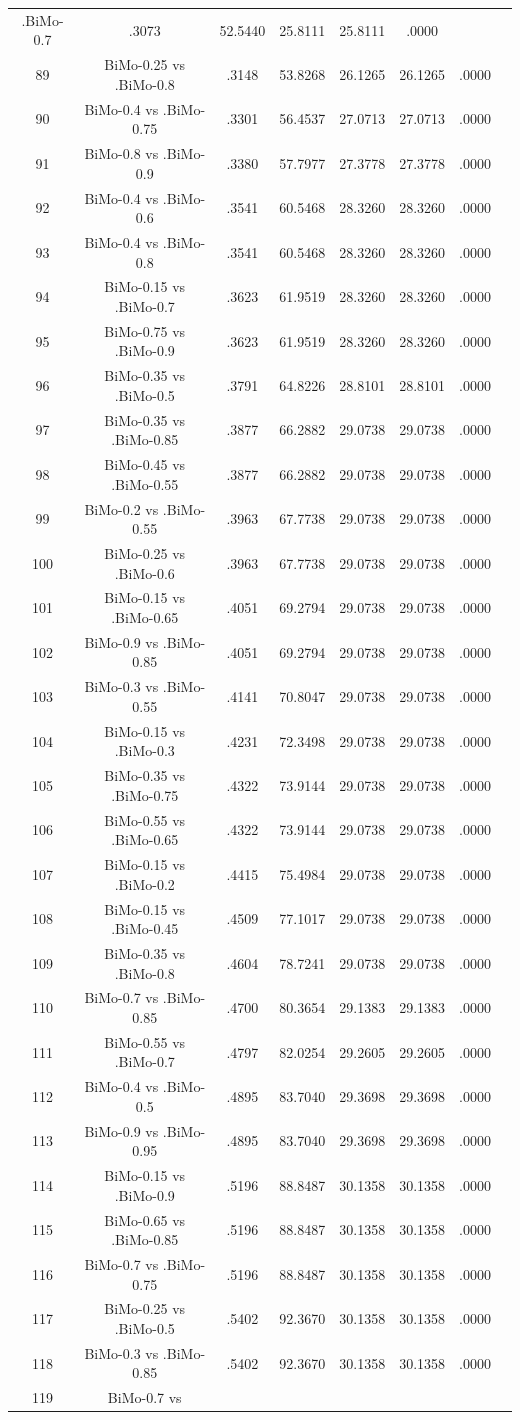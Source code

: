 \documentclass[a4paper,10pt]{article}
\begin{document}
\begin{landscape}
\begin{table}[!htp]
\begin{tabular}{cccccccc}
.BiMo-0.7&.3073&52.5440&25.8111&25.8111&.0000\\89&BiMo-0.25 vs .BiMo-0.8&.3148&53.8268&26.1265&26.1265&.0000\\90&BiMo-0.4 vs .BiMo-0.75&.3301&56.4537&27.0713&27.0713&.0000\\91&BiMo-0.8 vs .BiMo-0.9&.3380&57.7977&27.3778&27.3778&.0000\\92&BiMo-0.4 vs .BiMo-0.6&.3541&60.5468&28.3260&28.3260&.0000\\93&BiMo-0.4 vs .BiMo-0.8&.3541&60.5468&28.3260&28.3260&.0000\\94&BiMo-0.15 vs .BiMo-0.7&.3623&61.9519&28.3260&28.3260&.0000\\95&BiMo-0.75 vs .BiMo-0.9&.3623&61.9519&28.3260&28.3260&.0000\\96&BiMo-0.35 vs .BiMo-0.5&.3791&64.8226&28.8101&28.8101&.0000\\97&BiMo-0.35 vs .BiMo-0.85&.3877&66.2882&29.0738&29.0738&.0000\\98&BiMo-0.45 vs .BiMo-0.55&.3877&66.2882&29.0738&29.0738&.0000\\99&BiMo-0.2 vs .BiMo-0.55&.3963&67.7738&29.0738&29.0738&.0000\\100&BiMo-0.25 vs .BiMo-0.6&.3963&67.7738&29.0738&29.0738&.0000\\101&BiMo-0.15 vs .BiMo-0.65&.4051&69.2794&29.0738&29.0738&.0000\\102&BiMo-0.9 vs .BiMo-0.85&.4051&69.2794&29.0738&29.0738&.0000\\103&BiMo-0.3 vs .BiMo-0.55&.4141&70.8047&29.0738&29.0738&.0000\\104&BiMo-0.15 vs .BiMo-0.3&.4231&72.3498&29.0738&29.0738&.0000\\105&BiMo-0.35 vs .BiMo-0.75&.4322&73.9144&29.0738&29.0738&.0000\\106&BiMo-0.55 vs .BiMo-0.65&.4322&73.9144&29.0738&29.0738&.0000\\107&BiMo-0.15 vs .BiMo-0.2&.4415&75.4984&29.0738&29.0738&.0000\\108&BiMo-0.15 vs .BiMo-0.45&.4509&77.1017&29.0738&29.0738&.0000\\109&BiMo-0.35 vs .BiMo-0.8&.4604&78.7241&29.0738&29.0738&.0000\\110&BiMo-0.7 vs .BiMo-0.85&.4700&80.3654&29.1383&29.1383&.0000\\111&BiMo-0.55 vs .BiMo-0.7&.4797&82.0254&29.2605&29.2605&.0000\\112&BiMo-0.4 vs .BiMo-0.5&.4895&83.7040&29.3698&29.3698&.0000\\113&BiMo-0.9 vs .BiMo-0.95&.4895&83.7040&29.3698&29.3698&.0000\\114&BiMo-0.15 vs .BiMo-0.9&.5196&88.8487&30.1358&30.1358&.0000\\115&BiMo-0.65 vs .BiMo-0.85&.5196&88.8487&30.1358&30.1358&.0000\\116&BiMo-0.7 vs .BiMo-0.75&.5196&88.8487&30.1358&30.1358&.0000\\117&BiMo-0.25 vs .BiMo-0.5&.5402&92.3670&30.1358&30.1358&.0000\\118&BiMo-0.3 vs .BiMo-0.85&.5402&92.3670&30.1358&30.1358&.0000\\119&BiMo-0.7 vs 
\end{tabular}
\end{table}
\end{landscape}
\end{document}
